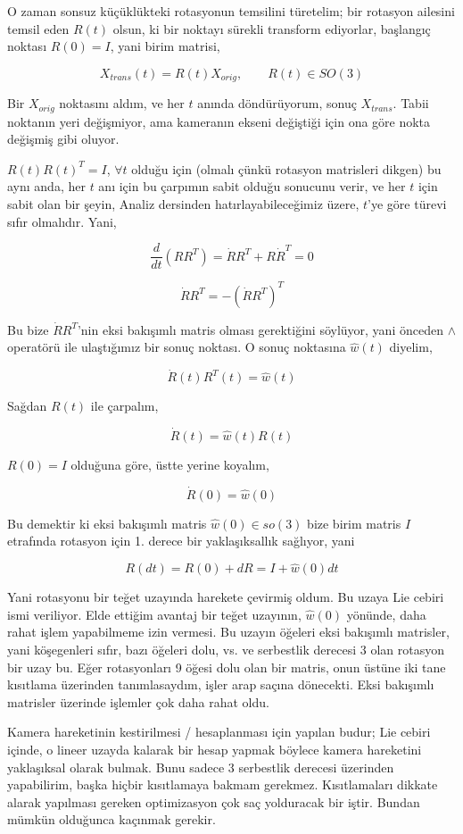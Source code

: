 \documentclass[12pt,fleqn]{article}\usepackage{../../common}
\begin{document}
O zaman sonsuz küçüklükteki rotasyonun temsilini türetelim; bir rotasyon
ailesini temsil eden $R(t)$ olsun, ki bir noktayı sürekli transform
ediyorlar, başlangıç noktası $R(0) = I$, yani birim matrisi,

$$ X_{trans}(t) = R(t) X_{orig}, \qquad R(t) \in SO(3) $$

Bir $X_{orig}$ noktasını aldım, ve her $t$ anında döndürüyorum, sonuç
$X_{trans}$. Tabii noktanın yeri değişmiyor, ama kameranın ekseni değiştiği
için ona göre nokta değişmiş gibi oluyor. 

$R(t)R(t)^T = I$, $\forall t$ olduğu için (olmalı çünkü rotasyon matrisleri
dikgen) bu aynı anda, her $t$ anı için bu çarpımın sabit olduğu sonucunu
verir, ve her $t$ için sabit olan bir şeyin, Analiz dersinden
hatırlayabileceğimiz üzere, $t$'ye göre türevi sıfır olmalıdır. Yani,

$$ \frac{d}{dt} (RR^T) = \dot{R}R^T + R \dot{R}^T = 0 $$

$$  \dot{R}R^T = - (\dot{R}R^T)^T  $$

Bu bize $\dot{R}R^T$'nin eksi bakışımlı matris olması gerektiğini söylüyor,
yani önceden $\land$ operatörü ile ulaştığımız bir sonuç noktası. O sonuç
noktasına $\hat{w}(t)$ diyelim,

$$\dot{R}(t)R^T(t) = \hat{w}(t)$$

Sağdan $R(t)$ ile çarpalım, 

$$\dot{R}(t) = \hat{w}(t)R(t)$$

$R(0)=I$ olduğuna göre, üstte yerine koyalım, 

$$\dot{R}(0) = \hat{w}(0)  $$

Bu demektir ki eksi bakışımlı matris $\hat{w}(0) \in so(3)$ bize birim
matris $I$ etrafında rotasyon için 1. derece bir yaklaşıksallık sağlıyor,
yani 

$$ R(dt) = R(0) + dR = I +  \hat{w}(0) dt $$

Yani rotasyonu bir teğet uzayında harekete çevirmiş oldum. Bu uzaya Lie
cebiri ismi veriliyor. Elde ettiğim avantaj bir teğet uzayının,
$\hat{w}(0)$ yönünde, daha rahat işlem yapabilmeme izin vermesi. Bu uzayın
öğeleri eksi bakışımlı matrisler, yani köşegenleri sıfır, bazı öğeleri
dolu, vs. ve serbestlik derecesi 3 olan rotasyon bir uzay bu. Eğer
rotasyonları 9 öğesi dolu olan bir matris, onun üstüne iki tane kısıtlama
üzerinden tanımlasaydım, işler arap saçına dönecekti. Eksi bakışımlı
matrisler üzerinde işlemler çok daha rahat oldu.

Kamera hareketinin kestirilmesi / hesaplanması için yapılan budur; Lie
cebiri içinde, o lineer uzayda kalarak bir hesap yapmak böylece kamera
hareketini yaklaşıksal olarak bulmak. Bunu sadece 3 serbestlik derecesi
üzerinden yapabilirim, başka hiçbir kısıtlamaya bakmam
gerekmez. Kısıtlamaları dikkate alarak yapılması gereken optimizasyon çok
saç yolduracak bir iştir. Bundan mümkün olduğunca kaçınmak gerekir.
\end{document}
